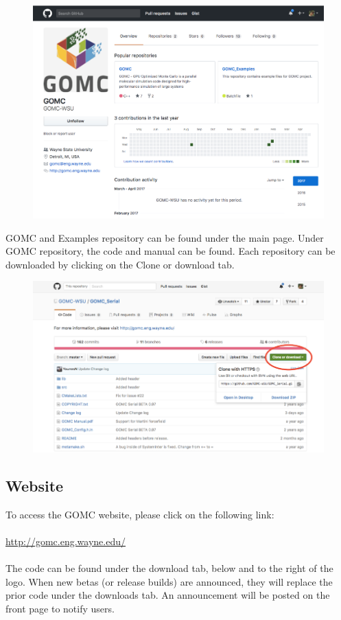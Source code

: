 \begin{figure}[H]
\centering
\includegraphics[scale=0.6]{images/github}
\end{figure}

GOMC and Examples repository can be found under the main page. Under GOMC repository, the code and manual can be found. Each repository can be downloaded by clicking on the Clone or download tab. 

\begin{figure}[H]
\centering
\includegraphics[scale=0.8]{images/clone}
\end{figure}

\subsection{Website}
To access the GOMC website, please click on the following link:\\\\
\url{http://gomc.eng.wayne.edu/} \\\\
The code can be found under the download tab, below and to the right of the logo.  When new betas (or release builds) are announced, they will replace the prior code under the downloads tab.  An announcement will be posted on the front page to notify users.

